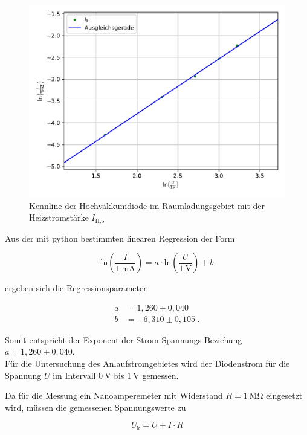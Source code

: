 \begin{figure} [H]
  \centering
  \includegraphics{content/plot2.pdf}
  \caption{Kennline der Hochvakkumdiode im Raumladungsgebiet mit der Heizstromstärke $I_\text{H,5}$}
  \label{fig:plot2}
\end{figure}

Aus der mit python bestimmten linearen Regression der Form 

\begin{equation*}
    \text{ln} \left(\frac{I}{\SI{1}{\milli\ampere}} \right) 
    = a \cdot \text{ln} \left(\frac{U}{\SI{1}{\volt}} \right) + b
\end{equation*}

ergeben sich die Regressionsparameter 

\begin{align*}
    a &= 1,260  \pm 0,040 \\
    b &= -6,310 \pm 0,105 \; .
\end{align*}

Somit entspricht der Exponent der Strom-Spannungs-Beziehung $a = 1,260  \pm 0,040$.\\

Für die Untersuchung des Anlaufstromgebietes wird der Diodenstrom für die Spannung $U$ im 
Intervall $\SI{0}{\volt}$ bis $\SI{1}{\volt}$ gemessen. 

Da für die Messung ein Nanoamperemeter mit Widerstand $R = \SI{1}{\mega\ohm}$ eingesetzt wird,
müssen die gemessenen Spannungswerte zu

\begin{equation*}
    U_\text{k} = U + I \cdot R
\end{equation*}


